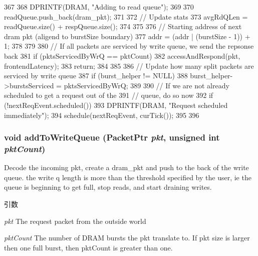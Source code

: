 \begin{DoxyCode}
{{{367 
368             DPRINTF(DRAM, "Adding to read queue\n");
369 
370             readQueue.push_back(dram_pkt);
371 
372             // Update stats
373             avgRdQLen = readQueue.size() + respQueue.size();
374         }
375 
376         // Starting address of next dram pkt (aligend to burstSize boundary)
377         addr = (addr | (burstSize - 1)) + 1;
378     }
379 
380     // If all packets are serviced by write queue, we send the repsonse back
381     if (pktsServicedByWrQ == pktCount) {
382         accessAndRespond(pkt, frontendLatency);
383         return;
384     }
385 
386     // Update how many split packets are serviced by write queue
387     if (burst_helper != NULL)
388         burst_helper->burstsServiced = pktsServicedByWrQ;
389 
390     // If we are not already scheduled to get a request out of the
391     // queue, do so now
392     if (!nextReqEvent.scheduled()) {
393         DPRINTF(DRAM, "Request scheduled immediately\n");
394         schedule(nextReqEvent, curTick());
395     }
396 }
\end{DoxyCode}
\hypertarget{classDRAMCtrl_a9538c5891b7139a62cffe6cbd7853b9a}{
\subsubsection[{addToWriteQueue}]{\setlength{\rightskip}{0pt plus 5cm}void addToWriteQueue ({\bf PacketPtr} {\em pkt}, \/  unsigned int {\em pktCount})}}
\label{classDRAMCtrl_a9538c5891b7139a62cffe6cbd7853b9a}
Decode the incoming pkt, create a dram\_\-pkt and push to the back of the write queue.  the write q length is more than the threshold specified by the user, ie the queue is beginning to get full, stop reads, and start draining writes.


\begin{DoxyParams}{引数}
\item[{\em pkt}]The request packet from the outside world \item[{\em pktCount}]The number of DRAM bursts the pkt translate to. If pkt size is larger then one full burst, then pktCount is greater than one. \end{DoxyParams}



